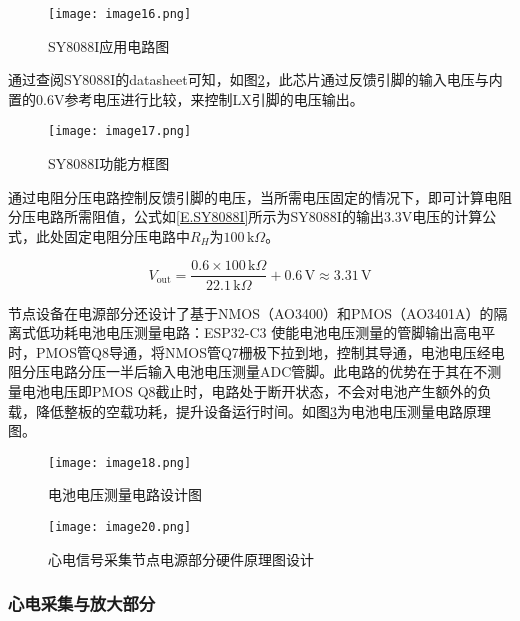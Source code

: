 \begin{figure}[hbt]
    \centering
    \texttt{[image: image16.png]}
    \caption{SY8088I应用电路图}
    \label{F.ECG_image16}
\end{figure}

通过查阅SY8088I的datasheet可知，如图\ref{F.ECG_image17}，此芯片通过反馈引脚的输入电压与内置的0.6V参考电压进行比较，来控制LX引脚的电压输出。

\begin{figure}[hbt]
    \centering
    \texttt{[image: image17.png]}
    \caption{SY8088I功能方框图}
    \label{F.ECG_image17}
\end{figure}

通过电阻分压电路控制反馈引脚的电压，当所需电压固定的情况下，即可计算电阻分压电路所需阻值，公式如\ref{E.SY8088I}所示为SY8088I的输出3.3V电压的计算公式，此处固定电阻分压电路中$R_H$为$100\,\text{k}\Omega$。

\begin{equation}
        V_{\text{out}} = \frac{0.6 \times 100\,\text{k}\Omega}{22.1\,\text{k}\Omega} + 0.6\,\text{V} \approx 3.31\,\text{V}
    \label{E.SY8088I}
\end{equation}

节点设备在电源部分还设计了基于NMOS（AO3400）和PMOS（AO3401A）的隔离式低功耗电池电压测量电路：ESP32-C3 使能电池电压测量的管脚输出高电平时，PMOS管Q8导通，将NMOS管Q7栅极下拉到地，控制其导通，电池电压经电阻分压电路分压一半后输入电池电压测量ADC管脚。此电路的优势在于其在不测量电池电压即PMOS Q8截止时，电路处于断开状态，不会对电池产生额外的负载，降低整板的空载功耗，提升设备运行时间。如图\ref{F.ECG_image18}为电池电压测量电路原理图。

\begin{figure}[hbt]
    \centering
    \texttt{[image: image18.png]}
    \caption{电池电压测量电路设计图}
    \label{F.ECG_image18}
\end{figure}

\begin{sidewaysfigure}
    \centering
    \texttt{[image: image20.png]}
    \caption{心电信号采集节点电源部分硬件原理图设计}
    \label{F.ECG_image20}
\end{sidewaysfigure}

\newpage    %

\subsubsection{心电采集与放大部分}

